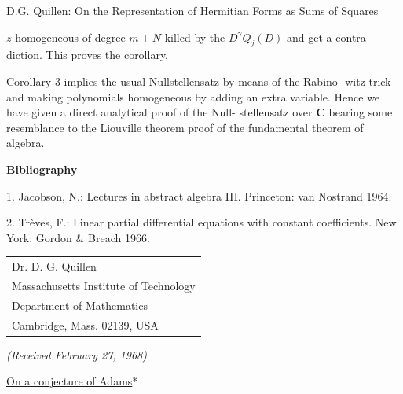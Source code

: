 
 D.G. Quillen: On the Representation of Hermitian Forms as Sums of Squares

$z$ homogeneous of degree $m+N$ killed by the $D^\gamma Q_j(D)$ and get a contra-%
diction. This proves the corollary.

Corollary 3 implies the usual Nullstellensatz by means of the Rabino-%
witz trick and making polynomials homogeneous by adding an extra
variable. Hence we have given a direct analytical proof of the Null-%
stellensatz over $\mathbf{C}$ bearing some resemblance to the Liouville theorem
proof of the fundamental theorem of algebra.

\begin{center}
\textbf{Bibliography}
\end{center}

1. Jacobson, N.: Lectures in abstract algebra III. Princeton: van Nostrand 1964.

2. Trèves, F.: Linear partial differential equations with constant coefficients. New York:
Gordon \& Breach 1966.

\begin{flushright}
\begin{tabular}{l}
Dr. D. G. Quillen\\
Massachusetts Institute of Technology\\
Department of Mathematics\\
Cambridge, Mass. 02139, USA
\end{tabular}
\end{flushright}

\begin{center}
\textit{(Received February 27, 1968)}
\end{center}



\begin{center}
\uline{On a conjecture of Adams}*

\end{center}


